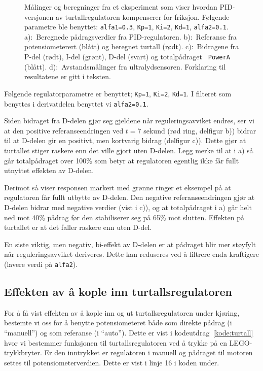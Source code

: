 \begin{figure}[H]
  \centering
  \hspace*{0mm}
  \caption{Målinger og beregninger fra et eksperiment som viser
    hvordan PID-versjonen av turtallregulatoren kompenserer for friksjon. Følgende
    parametre ble benyttet: {\tt alfa1=0.3}, {\tt Kp=1}, {\tt Ki=2},
    {\tt Kd=1}, {\tt alfa2=0.1}.
    a):~Beregnede pådragsverdier fra PID-regulatoren. 
    b):~Referanse fra potensiometerert (blått) og beregnet
    turtall (rødt). 
    c):~Bidragene fra P-del (rødt), I-del (grønt), D-del (svart) 
    og totalpådraget {\tt
      PowerA} (blått). 
    d):~Avstandsmålinger fra ultralydsensoren.
    Forklaring
    til resultatene er gitt i teksten.} 
  \label{fig:PID_reg}
\end{figure}
Følgende regulatorparametre er benyttet; 
{\tt Kp=1}, {\tt Ki=2},   {\tt Kd=1}. I filteret som benyttes i
derivatdelen benyttet vi {\tt alfa2=0.1}.

Siden bidraget fra D-delen gjør seg gjeldene når reguleringsavviket
endres, ser vi at den positive referanseendringen ved $t=7$ sekund
(rød ring, delfigur b)) bidrar til at D-delen gir en positivt, men kortvarig
bidrag (delfigur c)). Dette gjør at turtallet stiger raskere enn det
ville gjort uten D-delen. Legg merke til at i a) så går totalpådraget
over 100\% som betyr at regulatoren egentlig ikke får fullt utnyttet 
effekten av D-delen.

Derimot så viser responsen markert med grønne ringer et eksempel på
at regulatoren får fullt utbytte av D-delen. Den negative
referanseendringen gjør at D-delen bidrar med negative verdier (vist i
c)), og at totalpådraget i a) går helt ned mot 40\% pådrag før den
stabiliserer seg på 65\% mot slutten. Effekten på turtallet er at det
faller raskere enn uten D-del.


En siste viktig, men negativ, bi-effekt av D-delen er at 
pådraget blir mer støyfylt når reguleringsavviket
deriveres. Dette kan reduseres ved å filtrere enda kraftigere (lavere verdi
på {\tt alfa2}). 







\subsection{Effekten av å kople inn turtallsregulatoren}\label{kap:auto_manuell}


For å få vist effekten av å kople inn og ut turtallsregulatoren under kjøring, bestemte
vi oss for å benytte potensiometeret 
både som direkte pådrag (i ``manuell'') og som 
referanse (i ``auto''). 
Dette er vist i 
kodeutdrag~\ref{kode:turtall} hvor vi bestemmer funksjonen til
turtallsregulatoren ved å trykke på en LEGO-trykkbryter. Er den
inntrykket er regulatoren i manuell og
pådraget til motoren settes til  potensiometerverdien. Dette er vist i
linje 16 i koden under. 


